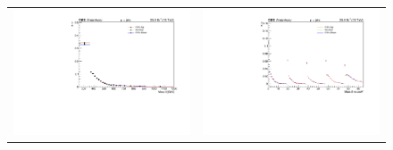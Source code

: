 \begin{figure}[htp]
\centering
\begin{tabular}{cc}

\hspace{-0.5cm}
\includegraphics[scale=0.4]
{fig/chapt6/qcd/qcd_mu_ch/ttbar_m_ttsys_UpDn.pdf}
& \hspace{-0.95cm} \includegraphics[scale=0.4]{fig/chapt6/qcd/qcd_mu_ch/ttbar_m_cosine_ttsys_UpDn.pdf}\\


\end{tabular}
\end{figure}
